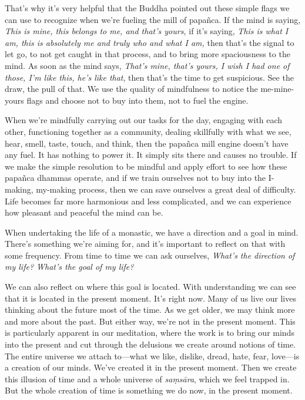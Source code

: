 That's why it's very helpful that the Buddha pointed out these simple 
flags we can use to recognize when we're fueling the mill of papañca. 
If the mind is saying, \emph{This is mine, this belongs to me, and 
that's yours,} if it's saying, \emph{This is what I am, this is 
absolutely me and truly who and what I am,} then that's the signal to 
let go, to not get caught in that process, and to bring more 
spaciousness to the mind. As soon as the mind says, \emph{That's mine, 
that's yours, I wish I had one of those, I'm like this, he's like 
that}, then that's the time to get suspicious. See the draw, the pull 
of that. We use the quality of mindfulness to notice the me-mine-yours 
flags and choose not to buy into them, not to fuel the engine.

When we're mindfully carrying out our tasks for the day, engaging with 
each other, functioning together as a community, dealing skillfully 
with what we see, hear, smell, taste, touch, and think, then the 
papañca mill engine doesn't have any fuel. It has nothing to power it. 
It simply sits there and causes no trouble. If we make the simple 
resolution to be mindful and apply effort to see how these papañca 
dhammas operate, and if we train ourselves not to buy into the 
I-making, my-making process, then we can save ourselves a great deal of 
difficulty. Life becomes far more harmonious and less complicated, and 
we can experience how pleasant and peaceful the mind can be.


When undertaking the life of a monastic, we have a direction and a goal 
in mind. There's something we're aiming for, and it's important to 
reflect on that with some frequency. From time to time we can ask 
ourselves, \emph{What's the direction of my life? What's the goal of my 
life?}

We can also reflect on where this goal is located. With understanding 
we can see that it is located in the present moment. It's right now. 
Many of us live our lives thinking about the future most of the time. 
As we get older, we may think more and more about the past. But either 
way, we're not in the present moment. This is particularly apparent in 
our meditation, where the work is to bring our minds into the present 
and cut through the delusions we create around notions of time. The 
entire universe we attach to---what we like, dislike, dread, hate, 
fear, love---is a creation of our minds. We've created it in the 
present moment. Then we create this illusion of time and a whole 
universe of \emph{saṃsāra}, which we feel trapped in. But the whole 
creation of time is something we do now, in the present moment.

